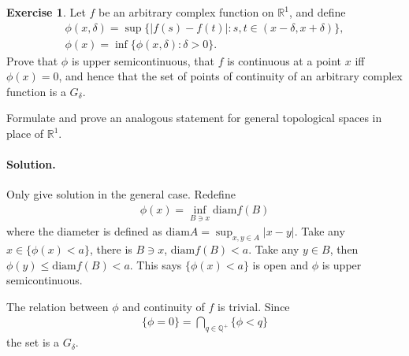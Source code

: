 \documentclass[10pt,a4paper]{book}
\theoremstyle{definition}
\newtheorem{exercise}{Exercise}[chapter]
\newcommand{\R}{\mathbb R}
\begin{document}
	\begin{exercise}
		Let $ f $ be an arbitrary complex function on $ \mathbb R^1 $, and define
		\begin{align*}
		\phi(x, \delta) = \sup \{|f(s) - f(t)|: s, t \in (x - \delta, x + \delta)\}, \\
		\phi(x) = \inf \{\phi(x, \delta): \delta > 0\}.
		\end{align*}
		Prove that $ \phi $ is upper semicontinuous, that $ f $ is continuous at a point $ x $ iff $ \phi(x) = 0 $, and
		hence that the set of points of continuity of an arbitrary complex function is a $ G_{\delta} $.

		Formulate and prove an analogous statement for general topological spaces in place of $ \R^1 $.

		\paragraph{Solution. }
		Only give solution in the general case. Redefine
		\begin{align*}
		\phi(x) = \inf_{B \ni x} \mathrm{diam} f(B)
		\end{align*}
		where the diameter is defined as $ \mathrm{diam} A = \sup_{x, y \in A} |x - y| $. Take any $ x \in \{\phi(x) < a\}$,
		there is $ B \ni x $, $ \mathrm{diam} f(B) < a $. Take any $ y \in B $, then $ \phi(y) \le \mathrm{diam}f(B) < a $.
		This says $  \{\phi(x) < a\} $ is open and $ \phi $ is upper semicontinuous.

		The relation between $ \phi $ and continuity of $ f $ is trivial. Since
		\begin{align*}
		\{\phi = 0\} = \bigcap_{q\in \mathbb Q^+} \{\phi < q\}
		\end{align*}
		the set is a $ G_\delta $.
	\end{exercise}
\end{document}
